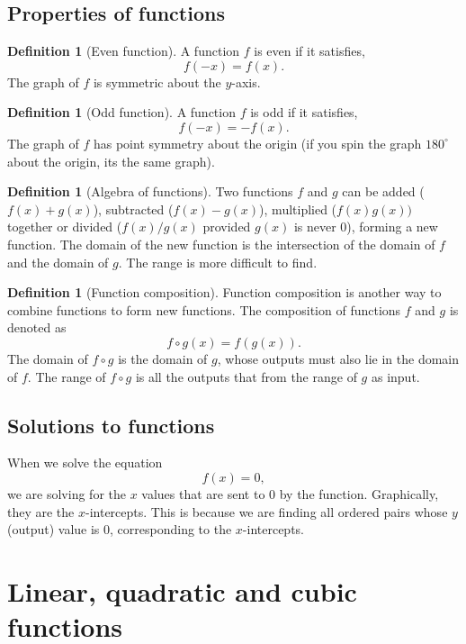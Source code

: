 \documentclass[12pt]{book}
\theoremstyle{definition}
\newtheorem{defi}[theo]{Definition}
\begin{document}
\subsection{Properties of functions}
  \begin{defi}[Even function]
    A function $f$ is even if it satisfies, \[f(-x)=f(x).\] The graph of $f$ is symmetric about
    the $y$-axis.
  \end{defi}
  \begin{defi}[Odd function]
    A function $f$ is odd if it satisfies, \[f(-x)=-f(x).\] The graph of $f$ has point symmetry about the origin (if you
    spin the graph $180^\circ$ about the origin, its the same graph).
  \end{defi}
  \begin{defi}[Algebra of functions]
    Two functions $f$ and $g$ can be added ($f(x)+g(x)$), subtracted ($f(x)-g(x)$), multiplied ($f(x)g(x))$ together or 
    divided ($f(x)/g(x)$ provided $g(x)$ is never $0$), forming a new function. The domain of the new function is the intersection of the domain of $f$
    and the domain of $g$. The range is more difficult to find.
  \end{defi}
  \begin{defi}[Function composition]
    Function composition is another way to combine functions to form new functions. The composition of functions $f$ and $g$
    is denoted as \[f\circ g(x)=f(g(x)).\] The domain of $f\circ g$ is the domain of $g$, whose outputs must also lie in the
    domain of $f$. The range of $f\circ g$ is all the outputs that from the range of $g$ as input.
  \end{defi}
\subsection{Solutions to functions}
  When we solve the equation \[f(x)=0,\] we are solving for the $x$ values that are sent to $0$ by the function. Graphically,
  they are the $x$-intercepts. This is because we are finding all ordered pairs whose $y$ (output) value is $0$, corresponding
  to the $x$-intercepts.
\section{Linear, quadratic and cubic functions}
\end{document}
